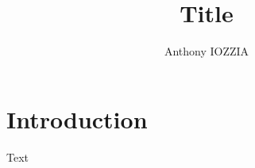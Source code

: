 \documentclass{article}
\title{Title}
\author{Anthony IOZZIA}
\affil{Course: course name}
\affil{Teacher: teacher name}
\begin{document}
\maketitle


\thispagestyle{fancy}

\setcounter{tocdepth}{3}
\tableofcontents
\newpage


\section{Introduction}

Text

%
%
\end{document}
